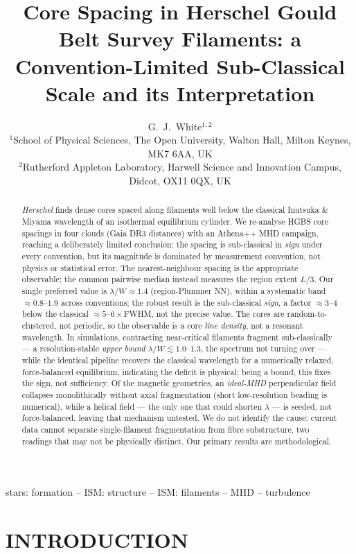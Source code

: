 \documentclass[usenatbib,twoside,twocolumn]{mnras}
\title{Core Spacing in Herschel Gould Belt Survey Filaments: a Convention-Limited Sub-Classical Scale and its Interpretation}
\author[G.~J.~White]{G.~J.~White$^{1,2}$\\
$^{1}$School of Physical Sciences, The Open University, Walton Hall, Milton Keynes, MK7 6AA, UK\\
$^{2}$Rutherford Appleton Laboratory, Harwell Science and Innovation Campus, Didcot, OX11 0QX, UK}
\begin{document}
\maketitle

\begin{abstract}
\textit{Herschel} finds dense cores spaced along filaments well below the classical Inutsuka \& Miyama wavelength of an isothermal equilibrium cylinder. We re-analyse HGBS core spacings in four clouds (Gaia DR3 distances) with an Athena++ MHD campaign, reaching a deliberately limited conclusion: the spacing is sub-classical in \emph{sign} under every convention, but its magnitude is dominated by measurement convention, not physics or statistical error. The nearest-neighbour spacing is the appropriate observable; the common pairwise median instead measures the region extent $L/3$. Our single preferred value is $\lambda/W\approx1.4$ (region-Plummer NN), within a systematic band $\approx0.8$--$1.9$ across conventions; the robust result is the sub-classical \emph{sign}, a factor $\approx3$--$4$ below the classical $\approx5$--$6\times$FWHM, not the precise value. The cores are random-to-clustered, not periodic, so the observable is a core \emph{line density}, not a resonant wavelength. In simulations, contracting near-critical filaments fragment sub-classically --- a resolution-stable \emph{upper bound} $\lambda/W\lesssim1.0$--$1.3$, the spectrum not turning over --- while the identical pipeline recovers the classical wavelength for a numerically relaxed, force-balanced equilibrium, indicating the deficit is physical; being a bound, this fixes the sign, not sufficiency. Of the magnetic geometries, an \emph{ideal-MHD} perpendicular field collapses monolithically without axial fragmentation (short low-resolution beading is numerical), while a helical field --- the only one that could shorten $\lambda$ --- is seeded, not force-balanced, leaving that mechanism untested. We do not identify the cause: current data cannot separate single-filament fragmentation from fibre substructure, two readings that may not be physically distinct. Our primary results are methodological.
\end{abstract}


\begin{keywords}
stars: formation -- ISM: structure -- ISM: filaments -- MHD -- turbulence
\end{keywords}

\section{INTRODUCTION}
\end{document}
